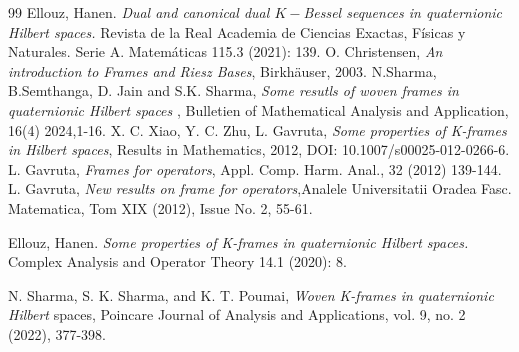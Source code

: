\documentclass[a4paper,12pt,reqno]{amsart}
\theoremstyle{plain}
\theoremstyle{remark}
\begin{document}
	\begin{thebibliography}{99}\fontsize{9}{9}\selectfont
		 Ellouz, Hanen. \emph{Dual and canonical dual $K-$Bessel sequences in quaternionic Hilbert spaces.}
		Revista de la Real Academia de Ciencias Exactas, Físicas y Naturales. Serie A. Matemáticas 115.3 (2021): 139.
		 O. Christensen,
		\emph{An introduction to Frames and Riesz Bases}, Birkh\"{a}user,
		2003.
		 N.Sharma, B.Semthanga, D. Jain and S.K. Sharma, \emph{Some resutls of woven frames in quaternionic Hilbert spaces }, Bulletien of Mathematical Analysis and Application, 16(4) 2024,1-16.
		 X. C. Xiao, Y. C. Zhu, L. Gavruta, \emph{Some properties of K-frames in Hilbert spaces}, Results in Mathematics, 2012, DOI: 10.1007/s00025-012-0266-6.
		 L. Gavruta, \emph{Frames for operators}, Appl. Comp. Harm. Anal., 32 (2012) 139-144.
		 L. Gavruta, \emph{New results on frame for operators},Analele Universitatii Oradea
		Fasc. Matematica, Tom XIX (2012), Issue No. 2, 55-61.
		
		
		 Ellouz, Hanen. \emph{Some properties of K-frames in quaternionic Hilbert spaces.} Complex Analysis and Operator Theory 14.1 (2020): 8.
		
		  N. Sharma, S. K. Sharma, and K. T. Poumai,\emph{ Woven K-frames in quaternionic Hilbert}
		spaces, Poincare Journal of Analysis and Applications, vol. 9, no. 2 (2022), 377-398.
		

\end{thebibliography}
\end{document}
